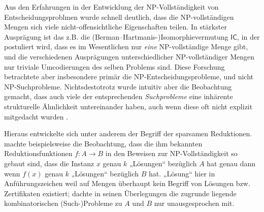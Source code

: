 

Aus den Erfahrungen in der Entwicklung der NP-Vollständigkeit von Entscheidungsproblmen wurde schnell deutlich, dass die NP-vollständigen Mengen sich viele nicht-offensichtliche Eigenschaften teilen. 
In stärkster Ausprägung ist das z.B. die (Berman–Hartmanis-\nolinebreak)\linebreak[1]Isomorphievermutung $\mathsf{IC}$, in der postuliert wird, dass es im Wesentlichen nur \emph{eine} NP-vollständige Menge gibt, und die verschiedenen Ausprägungen unterschiedlicher NP-vollständiger Mengen nur triviale Umcodierungen des selben Problems sind.
Diese Forschung betrachtete aber insbesondere primär die NP-Entscheidungsprobleme, und nicht NP-Suchprobleme.
Nichtsdestotrotz wurde intuitiv aber die Beobachtung gemacht, dass auch viele der entsprechenden \emph{Suchprobleme} eine inhärente strukturelle Ähnlichkeit untereinander haben, auch wenn diese oft nicht explizit mitgedacht wurden \parencite[vgl. auch die Diskussion von][]{hemaspaandra_take-home_1998}.

Hieraus entwickelte sich unter anderem der Begriff der sparsamen Reduktionen.
\textcite[83]{simon_central_1975} machte beispielsweise die Beobachtung, dass die ihm bekannten Reduktionsfunktionen $f\colon A\to B$ in den Beweisen zur NP-Vollständigkeit so gebaut sind, dass die Instanz $x$ genau $k$ „Lösungen“ bezüglich $A$ hat genau dann wenn $f(x)$ genau $k$ „Lösungen“ bezüglich $B$ hat. „Lösung“ hier in Anführungszeichen weil auf Mengen überhaupt kein Begriff von Lösungen bzw. Zertifikaten existiert; \citeauthor{simon_central_1975} dachte in seinen Überlegungen die zugrunde liegende kombinatorischen (Such-)Probleme zu $A$ und $B$ nur unausgesprochen mit.

